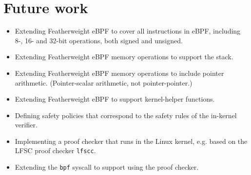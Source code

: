 \section{Future work}
\label{sec:future_work}



\begin{itemize}
\item Extending Featherweight eBPF to cover all instructions in eBPF, including 8-, 16- and 32-bit operations, both signed and unsigned. 
\item Extending Featherweight eBPF memory operations to support the stack.
\item Extending Featherweight eBPF memory operations to include pointer arithmetic. (Pointer-scalar arithmetic, not pointer-pointer.)
\item Extending Featherweight eBPF to support kernel-helper functions.
\item Defining safety policies that correspond to the safety rules of the in-kernel verifier.
\item Implementing a proof checker that runs in the Linux kernel, e.g. based on the LFSC proof checker \texttt{lfscc}.
\item Extending the \texttt{bpf} syscall to support using the proof checker.
\end{itemize}
